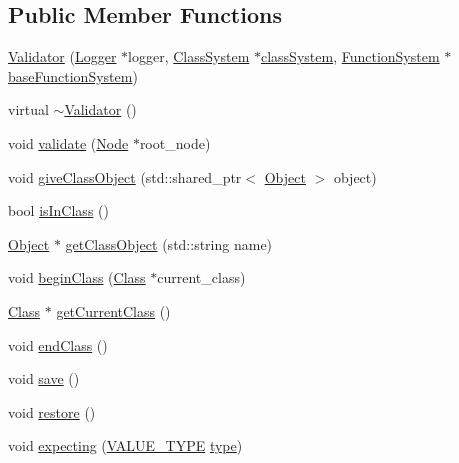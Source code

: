 \subsection*{Public Member Functions}
\begin{DoxyCompactItemize}
\item 
\hyperlink{classValidator_ae4550667c2bc1d85f4654cf6f5efe253}{Validator} (\hyperlink{classLogger}{Logger} $\ast$logger, \hyperlink{classClassSystem}{Class\+System} $\ast$\hyperlink{classSystemHandler_ace6de39b5621a138654577c93f3ce9aa}{class\+System}, \hyperlink{classFunctionSystem}{Function\+System} $\ast$\hyperlink{classSystemHandler_af601707ec9f56e24be4c0541a1c760f4}{base\+Function\+System})
\item 
virtual \hyperlink{classValidator_a4270e7ebf0c451ff80b4ec6fd8eb6a42}{$\sim$\+Validator} ()
\item 
void \hyperlink{classValidator_aa0bc30458ce0255fcec64d8346e384a5}{validate} (\hyperlink{classNode}{Node} $\ast$root\+\_\+node)
\item 
void \hyperlink{classValidator_ad0a3d5e1c57840006e96c74c74eac0aa}{give\+Class\+Object} (std\+::shared\+\_\+ptr$<$ \hyperlink{classObject}{Object} $>$ object)
\item 
bool \hyperlink{classValidator_a497b47a6718ba3b84a73bc9ee4fd9796}{is\+In\+Class} ()
\item 
\hyperlink{classObject}{Object} $\ast$ \hyperlink{classValidator_afe99d9833e5cda3ab1aab764ab99d716}{get\+Class\+Object} (std\+::string name)
\item 
void \hyperlink{classValidator_a364835c9dc181485838d083b6f227fdb}{begin\+Class} (\hyperlink{classClass}{Class} $\ast$current\+\_\+class)
\item 
\hyperlink{classClass}{Class} $\ast$ \hyperlink{classValidator_a342833ad81caff452754620d29083a3d}{get\+Current\+Class} ()
\item 
void \hyperlink{classValidator_a1d31142fe2275fbc9556d1164b01cbfb}{end\+Class} ()
\item 
void \hyperlink{classValidator_a055e6bdb84438449655135b9166bcf2d}{save} ()
\item 
void \hyperlink{classValidator_a0c89c0c840be87b9011cb518d7bc12ff}{restore} ()
\item 
void \hyperlink{classValidator_a38479b2cec77382e7c25ce898f4d47f9}{expecting} (\hyperlink{statics_8h_a0674a913b8e8c8a9f265baab3646b565}{V\+A\+L\+U\+E\+\_\+\+T\+Y\+PE} \hyperlink{classSystemHandler_a8ca6090af683e8555051681fd31cd865}{type})
\item 

\end{DoxyCompactItemize}
